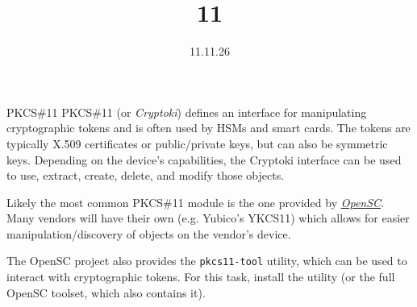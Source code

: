 \documentclass{practice}
\title{11}
\date{11.11.26}
\begin{document}
\maketitle

\begin{task}{PKCS\#11}
  PKCS\#11 (or \emph{Cryptoki}) defines an interface for manipulating cryptographic tokens and is often used by HSMs and smart cards.
  The tokens are typically X.509 certificates or public/private keys, but can also be symmetric keys.
  Depending on the device's capabilities, the Cryptoki interface can be used to use, extract, create, delete, and modify those objects.

  Likely the most common PKCS\#11 module is the one provided by \href{https://github.com/opensc/opensc}{\emph{OpenSC}}.
  Many vendors will have their own (e.g. Yubico's YKCS11) which allows for easier manipulation/discovery of objects on the vendor's device.

  The OpenSC project also provides the \texttt{pkcs11-tool} utility, which can be used to interact with cryptographic tokens.
  For this task, install the utility (or the full OpenSC toolset, which also contains it).
\end{task}
\end{document}
